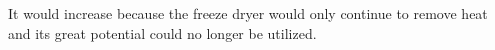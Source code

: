 It would increase because the freeze dryer would only continue to remove heat and its great potential could no longer be utilized.